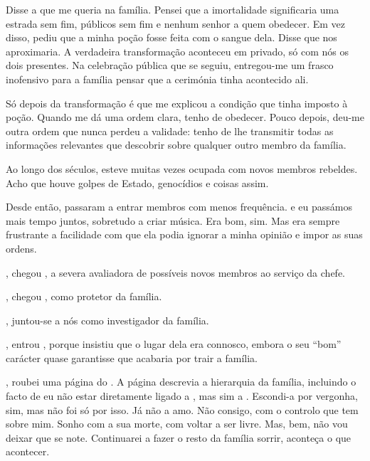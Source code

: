 {Disse a  que me queria na família. Pensei que a imortalidade significaria uma estrada sem fim, públicos sem fim e nenhum senhor a quem obedecer. Em vez disso,  pediu que a minha poção fosse feita com o sangue dela. Disse que nos aproximaria. A verdadeira transformação aconteceu em privado, só com nós os dois presentes. Na celebração pública que se seguiu,  entregou-me um frasco inofensivo para a família pensar que a cerimónia tinha acontecido ali.

Só depois da transformação é que  me explicou a condição que tinha imposto à poção. Quando me dá uma ordem clara, tenho de obedecer. Pouco depois, deu-me outra ordem que nunca perdeu a validade: tenho de lhe transmitir todas as informações relevantes que descobrir sobre qualquer outro membro da família.

Ao longo dos séculos,  esteve muitas vezes ocupada com novos membros rebeldes. Acho que houve golpes de Estado, genocídios e coisas assim.

Desde então, passaram a entrar membros com menos frequência.  e eu passámos mais tempo juntos, sobretudo a criar música. Era bom, sim. Mas era sempre frustrante a facilidade com que ela podia ignorar a minha opinião e impor as suas ordens.

, chegou , a severa avaliadora de possíveis novos membros ao serviço da chefe.

, chegou , como protetor da família.

,  juntou-se a nós como investigador da família.

, entrou , porque  insistiu que o lugar dela era connosco, embora o seu ``bom'' carácter quase garantisse que acabaria por trair a família.

, roubei uma página do . A página descrevia a hierarquia da família, incluindo o facto de eu não estar diretamente ligado a , mas sim a . Escondi-a por vergonha, sim, mas não foi só por isso. Já não a amo. Não consigo, com o controlo que tem sobre mim. Sonho com a sua morte, com voltar a ser livre. Mas, bem, não vou deixar que se note. Continuarei a fazer o resto da família sorrir, aconteça o que acontecer.

}
